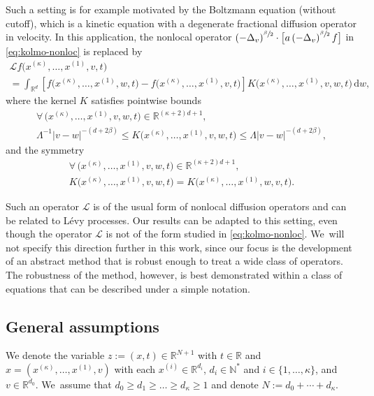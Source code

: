 \documentclass[10pt,a4paper]{amsart}
\theoremstyle{definition}
\newcommand\N{{\mathbb N}}
\newcommand\R{{\mathbb R}}
\newcommand{\dd}{{\, \mathrm d}}
\begin{document}
Such a setting is for example motivated by the Boltzmann equation (without
cutoff), which is a kinetic equation with a degenerate fractional diffusion
operator in velocity. In this application, the nonlocal operator
$\left(- \Delta_v \right)^{\sfrac{\beta}{2}} \cdot \bigl[ a \left(- \Delta_v \right)^{\sfrac{\beta}{2}} f \bigr]$
in \eqref{eq:kolmo-nonloc} is replaced by
\begin{multline*}
\mathcal L f\bigl(x^{(\kappa)},\dots,x^{(1)},v,t\bigr) \\
= \int_{\R^d} \left[ f\bigl(x^{(\kappa)},\dots,
x^{(1)},w,t\bigr) -f\bigl(x^{(\kappa)},\dots,x^{(1)},v,t
\bigr) \right]
K\bigl(x^{(\kappa)},\dots,x^{(1)},v,w,t\bigr) \dd w,
\end{multline*}
where the kernel $K$ satisfies pointwise bounds
\begin{multline}
\forall \, \bigl(x^{(\kappa)},\dots,x^{(1)},v,w,t\bigr)
\in \R^{(\kappa+2)d+1}, \\
\label{eq:elliptic-nonloc}
\Lambda^{-1} \big\vert v - w\big\vert^{-(d+2\beta)} \leq
K\bigl(x^{(\kappa)},\dots,x^{(1)},v,w,t\bigr) \leq \Lambda
\big\vert v - w\big\vert^{-(d+2\beta)},
\end{multline}
and the symmetry
\begin{multline}
\forall \, \bigl(x^{(\kappa)},\dots,x^{(1)},v,w,t\bigr)
\in \R^{(\kappa+2)d+1},\\
\label{eq:symmetry-nonloc}
K\bigl(x^{(\kappa)},\dots,x^{(1)},v,w,t\bigr) =
K\bigl(x^{(\kappa)},\dots,x^{(1)},w,v,t\bigr).
\end{multline}

Such an operator \(\mathcal L\) is of the usual form of nonlocal diffusion
operators and can be related to Lévy processes. Our results can be adapted to
this setting, even though the operator \(\mathcal L\) is not of the form studied
in \eqref{eq:kolmo-nonloc}. We~will not specify this direction further in this
work, since our focus is the development of an abstract method that is robust
enough to treat a wide class of operators. The robustness of the method,
however, is best demonstrated within a class of equations that can be described
under a simple notation.

\subsection{General assumptions}\label{subsec:H}
We denote the variable $z:=(x,t) \in \R^{N+1}$ with $t \in \R$ and
$x=(x^{(\kappa)},\dots,x^{(1)},v)$ with each
$x^{(i)} \in \R^{d_i}$, $d_i \in \N^*$ and
$i \in \{1,\dots,\kappa\}$, and $v \in \R^{d_0}$. We~assume that
$d_0 \geq d_1 \geq \dots \geq d_{\kappa}\geq 1$ and denote
$N:=d_0+\cdots+d_\kappa$.
\end{document}
